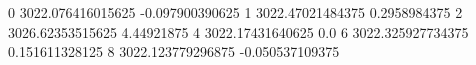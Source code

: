 0 3022.076416015625 -0.097900390625
1 3022.47021484375 0.2958984375
2 3026.62353515625 4.44921875
4 3022.17431640625 0.0
6 3022.325927734375 0.151611328125
8 3022.123779296875 -0.050537109375
